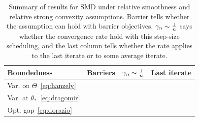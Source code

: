 \documentclass[twoside]{article}
\newcommand*{\expect}[2][]{\ensuremath{\mathbb{E}_{#1} \left[ #2 \right] }} %
\newcommand{\m}{\mu}
\newcommand{\lr}{\gamma} %
\begin{document}
\begin{table}[t]
\begingroup
\newcommand*{\greencmark}{\textcolor{Green}{\cmark}}
\newcommand*{\redxmark}{\textcolor{Red}{\xmark}}
\centering
\caption{Summary of results for SMD
under relative smoothness and relative strong convexity assumptions. 
Barrier tells whether the assumption can hold with barrier objectives.
$\lr_n \sim \inv{n}$ says whether the convergence rate hold with this step-size scheduling, and the last column tells whether the rate applies to the last iterate or to some average iterate.
}
\begin{tabular}{lccc}
\toprule
Boundedness & Barriers &  $\lr_n \sim \inv{n}$ & Last iterate \\
\midrule
Var. on $\Theta$~\eqref{eq:hanzely} %
& \redxmark & \greencmark  & \redxmark
\\
Var. at $\theta_*$~\eqref{eq:dragomir} %
& \redxmark & \greencmark  & \greencmark
\\
Opt. gap~\eqref{eq:dorazio} %
& \greencmark & \redxmark & \greencmark
\\
\bottomrule
\end{tabular}
\label{tbl:assumptions}
\endgroup
\end{table}
\end{document}
